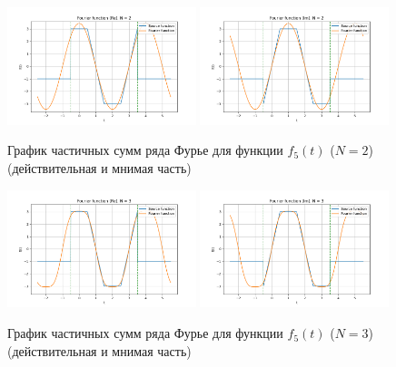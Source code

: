 \begin{figure}[ht!]
    \centering
    \includegraphics[width=0.49\textwidth]{media/plots/func_5_real_N_2.png}
    \includegraphics[width=0.49\textwidth]{media/plots/func_5_imag_N_2.png}
    \caption{График частичных сумм ряда Фурье для функции $f_5(t)$ ($N = 2$) (действительная и мнимая часть)}
    \label{fig:func_5_fourier_re_im_N_2}
\end{figure}

\begin{figure}[ht!]
    \centering
    \includegraphics[width=0.49\textwidth]{media/plots/func_5_real_N_3.png}
    \includegraphics[width=0.49\textwidth]{media/plots/func_5_imag_N_3.png}
    \caption{График частичных сумм ряда Фурье для функции $f_5(t)$ ($N = 3$) (действительная и мнимая часть)}
    \label{fig:func_5_fourier_re_im_N_3}
\end{figure}


